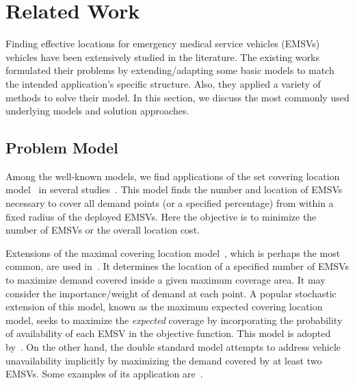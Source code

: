 \section{Related Work}\label{sec:literature}

Finding effective locations for emergency medical service vehicles (EMSVs) vehicles have been extensively studied in the literature. The existing works formulated their problems by extending/adapting some basic models to match the intended application's specific structure. Also, they applied a variety of methods to solve their model. In this section, we discuss the most commonly used underlying models and solution approaches. 

\subsection{Problem Model}

Among the well-known models, we find applications of the set covering location model~\cite{toregas1971location} in several studies~\cite{rajagopalan2008multiperiod, rajagopalan2011ambulance, shariat2012linear, saydam2013dynamic, aringhieri2016supporting}. This model finds the number and location of EMSVs necessary to cover all demand points (or a specified percentage) from within a fixed radius of the deployed EMSVs. Here the objective is to minimize the number of EMSVs or the overall location cost.

Extensions of the maximal covering location model~\cite{church1974101}, which is perhaps the most common, are used in~\cite{roislien2018comparing, hatta2013solving, ingolfsson2008optimal, lim2011impact, chanta2014improving, naoum2013stochastic}. It determines the location of a specified number of EMSVs to maximize demand covered inside a given maximum coverage area. It may consider the importance/weight of demand at each point. A popular stochastic extension of this model, known as the maximum expected covering location model, seeks to maximize the \textit{expected} coverage by incorporating the probability of availability of each EMSV in the objective function. This model is adopted by~\cite{morohosi2012hypercube, van2019improving, ingolfsson2008optimal, chuang2007maximum, erdougan2010scheduling}. On the other hand, the double standard model attempts to address vehicle unavailability implicitly by maximizing the demand covered by at least two EMSVs. Some examples of its application are~\cite{schmid2010ambulance, dibene2017optimizing, lahijanian2016double, gendreau1997solving, doerner2005heuristic}.   

